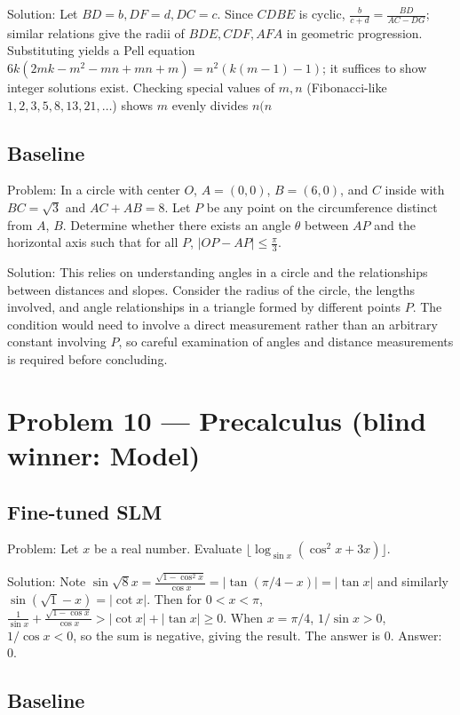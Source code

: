 \documentclass[11pt]{article}
\begin{document}
Solution:
Let $BD=b, DF=d, DC=c$. Since $CDBE$ is cyclic, $\frac{b}{c+d}=\frac{BD}{AC-DG}$; similar relations give the radii of $BDE, CDF, AFA$ in geometric progression. Substituting yields a Pell equation $6k(2mk-m^2-mn+mn+m)=n^2(k(m-1)-1)$; it suffices to show integer solutions exist. Checking special values of $m,n$ (Fibonacci-like $1,2,3,5,8,13,21,\ldots$) shows $m$ evenly divides $n(n$

\subsection*{Baseline}

Problem:
In a circle with center $O$, $A=(0,0)$, $B=(6,0)$, and $C$ inside with $BC = \sqrt{3}$ and $AC + AB = 8$. Let $P$ be any point on the circumference distinct from $A$, $B$. Determine whether there exists an angle $\theta$ between $AP$ and the horizontal axis such that for all $P$, $|OP - AP| \leq \frac{\pi}{3}$.

Solution:
This relies on understanding angles in a circle and the relationships between distances and slopes. Consider the radius of the circle, the lengths involved, and angle relationships in a triangle formed by different points $P$. The condition would need to involve a direct measurement rather than an arbitrary constant involving $P$, so careful examination of angles and distance measurements is required before concluding.

\section*{Problem 10 --- Precalculus \quad(blind winner: Model)}

\subsection*{Fine-tuned SLM}

Problem:
Let $x$ be a real number. Evaluate $\lfloor\log_{\sin x}(\cos^2 x+3x)\rfloor$.

Solution:
Note $\sin\sqrt8 x=\frac{\sqrt{1-\cos^2 x}}{\cos x}=|\tan(\pi/4-x)|=|\tan x|$ and similarly $\sin(\sqrt1-x)=|\cot x|$. Then for $0<x<\pi$, $\frac1{\sin x}+\frac{\sqrt{1-\cos x}}{\cos x} > |\cot x|+|\tan x| \ge 0$. When $x=\pi/4$, $1/\sin x>0$, $1/\cos x<0$, so the sum is negative, giving the result. The answer is $0$. Answer: 0.

\subsection*{Baseline}
\end{document}
